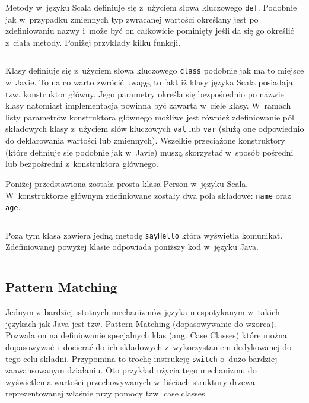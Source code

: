 \documentclass{xmgr}
\begin{document}
Metody w~języku Scala definiuje się z~użyciem słowa kluczowego \texttt{def}. Podobnie jak w~przypadku zmiennych typ zwracanej wartości określany jest po zdefiniowaniu nazwy i~może być on całkowicie pominięty jeśli da się go określić z~ciała metody. Poniżej przykłady kilku funkcji.

\inputminted{scala}{listings/scala/functions-example.scala}

Klasy definiuje się z~użyciem słowa kluczowego \texttt{class} podobnie jak ma to miejsce w~Javie. To na co warto zwrócić uwagę, to fakt iż klasy języka Scala posiadają tzw. konstruktor główny. Jego parametry określa się bezpośrednio po nazwie klasy natomiast implementacja powinna być zawarta w~ciele klasy. W~ramach listy parametrów konstruktora głównego możliwe jest również zdefiniowanie pól składowych klasy z~użyciem słów kluczowych \texttt{val} lub \texttt{var} (służą one odpowiednio do deklarowania wartości lub zmiennych). Wszelkie przeciążone konstruktory (które definiuje się podobnie jak w~Javie) muszą skorzystać w~sposób pośredni lub bezpośredni z~konstruktora głównego.

Poniżej przedstawiona została prosta klasa Person w~języku Scala. W~konstruktorze głównym zdefiniowane zostały dwa pola składowe: \texttt{name} oraz \texttt{age}.

\inputminted{scala}{listings/scala/simple-class-person.scala}

Poza tym klasa zawiera jedną metodę \texttt{sayHello} która wyświetla komunikat.
Zdefiniowanej powyżej klasie odpowiada poniższy kod w~języku Java.

\inputminted{scala}{listings/java/simple-class-person.java}

\subsection{Pattern Matching}

Jednym z~bardziej istotnych mechanizmów języka niespotykanym w~takich językach jak Java jest tzw. Pattern Matching (dopasowywanie do wzorca). Pozwala on na definiowanie specjalnych klas (ang. Case Classes) które można dopasowywać i~docierać do ich składowych z~wykorzystaniem dedykowanej do tego celu składni. Przypomina to trochę instrukcję \texttt{switch} o~dużo bardziej zaawansowanym działaniu. Oto przykład użycia tego mechanizmu do wyświetlenia wartości przechowywanych w~liściach struktury drzewa reprezentowanej właśnie przy pomocy tzw. case classes.
\newpage
\inputminted{scala}{listings/scala/pattern-matching-trees.scala}
\end{document}
